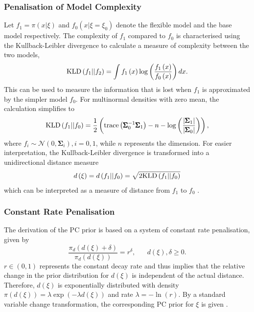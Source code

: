 \subsubsection*{Penalisation of Model Complexity} 
Let $f_1=\pi\left(x|\xi\right)$ and $f_0\left(x|\xi=\xi_0\right)$ denote the flexible model and the base model respectively. The complexity of $f_1$ compared to $f_0$ is characterised using the Kullback-Leibler divergence \autocite[][]{kullback1951information} to calculate a measure of complexity between the two models,
\begin{equation}
    \hbox{KLD}\left(f_1||f_2\right) = \int f_1\left(x\right)\log\left(\frac{f_1\left(x\right)}{f_0\left(x\right)}\right)dx.
\end{equation}
This can be used to measure the information that is lost when $f_1$ is approximated by the simpler model $f_0$. For multinormal densities with zero mean, the calculation simplifies to
\begin{equation}
    \hbox{KLD}\left(f_1||f_0\right) = \frac{1}{2}\left(\hbox{trace}\left(\pmb{\Sigma}_0^{-1}\pmb{\Sigma}_1\right)-n-\log\left(\frac{\left|\pmb{\Sigma}_1\right|}{\left|\pmb{\Sigma}_0\right|}\right)\right),
\end{equation}
where $f_i\sim\mathcal{N}\left(0,\pmb{\Sigma}_i\right), i=0,1$, while $n$ represents the dimension. For easier interpretation, the Kullback-Leibler divergence is transformed into a unidirectional distance measure
\begin{equation}
    d\left(\xi\right) = d\left(f_1||f_0\right)=\sqrt{2\hbox{KLD}\left(f_1||f_0\right)}
\end{equation}
which can be interpreted as a measure of distance from $f_1$ to $f_0$ \autocite[][]{martins2014penalising}.
\subsubsection*{Constant Rate Penalisation}
The derivation of the PC prior is based on a system of constant rate penalisation, given by
\begin{equation}
    \frac{\pi_d\left(d\left(\xi\right)+\delta\right)}{\pi_d\left(d\left(\xi\right)\right)}=r^{\delta}, \hspace{20pt} d\left(\xi\right),\delta\geq0.
\end{equation}
$r\in\left(0,1\right)$ represents the constant decay rate and thus implies that the relative change in the prior distribution for $d\left(\xi\right)$ is independent of the actual distance. Therefore, $d\left(\xi\right)$ is exponentially distributed with density $\pi\left(d\left(\xi\right)\right)=\lambda\exp\left(-\lambda d\left(\xi\right)\right)$ and rate $\lambda = -\ln\left(r\right)$. By a standard variable change transformation, the corresponding PC prior for $\xi$ is given \autocite[][]{martins2014penalising}.
